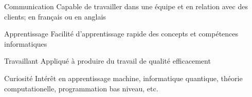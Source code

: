 

\begin{cvskills}

  \cvskill
    {Communication} %
    {Capable de travailler dans une équipe et en relation avec des clients; en français ou en anglais}
    
  \cvskill
    {Apprentissage} %
    {Facilité d'apprentissage rapide des concepts et compétences informatiques}
    
  \cvskill
    {Travaillant} %
    {Appliqué à produire du travail de qualité efficacement}
    
  \cvskill
    {Curiosité} %
    {Intérêt en apprentissage machine, informatique quantique, théorie computationelle, programmation bas niveau, etc.}

\end{cvskills}
